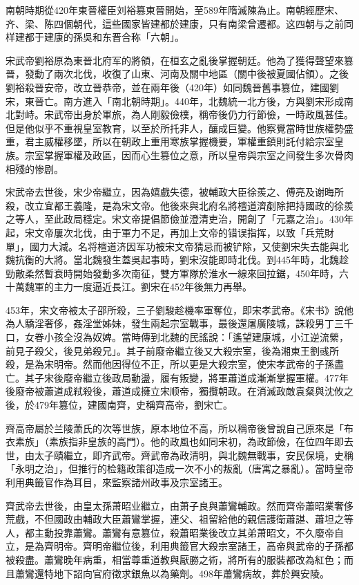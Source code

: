 南朝時期從420年東晉權臣刘裕篡東晉開始，至589年隋滅陳為止。南朝經歷宋、齐、梁、陈四個朝代，這些國家皆建都於建康，只有南梁曾遷都。这四朝与之前同样建都于建康的孫吳和东晋合称「六朝」。

宋武帝劉裕原為東晉北府军的將領，在桓玄之亂後掌握朝廷。他為了獲得聲望來篡晉，發動了兩次北伐，收復了山東、河南及關中地區（關中後被夏國佔領）。之後劉裕殺晉安帝，改立晉恭帝，並在兩年後（420年）如同魏晉舊事篡位，建國劉宋，東晉亡。南方進入「南北朝時期」。440年，北魏統一北方後，方與劉宋形成南北對峙。宋武帝出身於軍旅，為人剛毅儉樸，稱帝後仍力行節儉，一時政風甚佳。但是他似乎不重視皇室教育，以至於所托非人，釀成巨變。他察覺當時世族權勢盛重，君主威權移墜，所以在朝政上重用寒族掌握機要，軍權重鎮則託付給宗室皇族。宗室掌握軍權及政區，因而心生篡位之意，所以皇帝與宗室之间發生多次骨肉相殘的惨剧。

宋武帝去世後，宋少帝繼立，因為嬉戲失德，被輔政大臣徐羨之、傅亮及谢晦所殺，改立宜都王義隆，是為宋文帝。他後來與北府名將檀道濟剷除把持國政的徐羨之等人，至此政局穩定。宋文帝提倡節儉並澄清吏治，開創了「元嘉之治」。430年起，宋文帝屢次北伐，由于軍力不足，再加上文帝的错误指挥，以致「兵荒財單」，國力大減。名将檀道济因军功被宋文帝猜忌而被铲除，又使劉宋失去能與北魏抗衡的大將。當北魏發生蓋吳起事時，劉宋沒能即時北伐。到445年時，北魏趁勁敵柔然暫衰時開始發動多次南征，雙方軍隊於淮水一線來回拉鋸，450年時，六十萬魏軍的主力一度逼近長江。劉宋在452年後無力再舉。

453年，宋文帝被太子邵所殺，三子劉駿趁機率軍奪位，即宋孝武帝。《宋书》說他為人驕淫奢侈，姦淫堂姊妹，發生兩起宗室戰事，最後還屠廣陵城，誅殺男丁三千口，女眷小孩全沒為奴婢。當時傳到北魏的民謠說：「遙望建康城，小江逆流縈，前見子殺父，後見弟殺兄」。其子前廢帝繼立後又大殺宗室，後為湘東王劉彧所殺，是為宋明帝。然而他因得位不正，所以更是大殺宗室，使宋孝武帝的子孫盡亡。其子宋後廢帝繼立後政局動盪，履有叛變，將軍蕭道成漸漸掌握軍權。477年後廢帝被蕭道成弒殺後，蕭道成擁立宋顺帝，獨攬朝政。在消滅政敵袁粲與沈攸之後，於479年篡位，建國南齊，史稱齊高帝，劉宋亡。

齊高帝屬於兰陵萧氏的次等世族，原本地位不高，所以稱帝後曾說自己原來是「布衣素族」（素族指非皇族的高門）。他的政風也如同宋初，為政節儉，在位四年即去世，由太子賾繼立，即齐武帝。齊武帝為政清明，與北魏無戰事，安民保境，史稱「永明之治」，但推行的检籍政策卻造成一次不小的叛亂（唐寓之暴亂）。當時皇帝利用典籤官作為耳目，來監察諸州政事及宗室諸王。

齊武帝去世後，由皇太孫萧昭业繼立，由萧子良與蕭鸞輔政。然而齊帝蕭昭業奢侈荒戲，不但國政由輔政大臣蕭鸞掌握，連父、祖留給他的親信護衛蕭諶、蕭坦之等人，都主動投靠蕭鸞。蕭鸞有意篡位，殺蕭昭業後改立其弟萧昭文，不久廢帝自立，是為齊明帝。齊明帝繼位後，利用典籤官大殺宗室諸王，高帝與武帝的子孫都被殺盡。蕭鸞晚年病重，相當尊重道教與厭勝之術，將所有的服裝都改為紅色；而且蕭鸞還特地下詔向官府徵求銀魚以為藥劑。498年蕭鸞病故，葬於興安陵。

